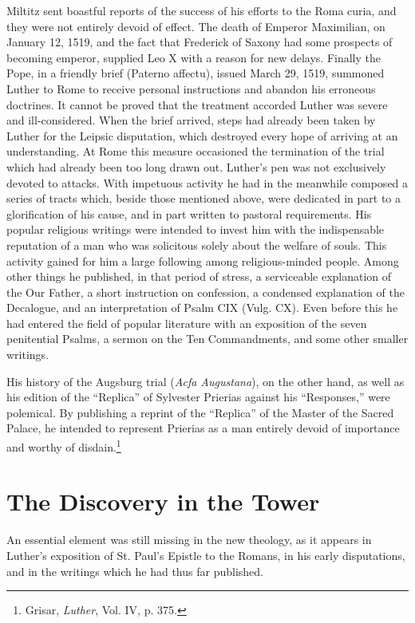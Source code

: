 Miltitz sent boastful reports of the success of his efforts to the
Roma curia, and they were not entirely devoid of effect. The death
of Emperor Maximilian, on January 12, 1519, and the fact that
Frederick of Saxony had some prospects of becoming emperor, supplied Leo
X with a reason for new delays. Finally the Pope, in a friendly
brief (Paterno affectu), issued March 29, 1519, summoned Luther
to Rome to receive personal instructions and abandon his erroneous
doctrines. It cannot be proved that the treatment accorded Luther
was severe and ill-considered. When the brief arrived, steps had already
been taken by Luther for the Leipsic disputation, which destroyed every
hope of arriving at an understanding. At Rome this
measure occasioned the termination of the trial which had already
been too long drawn out.
Luther’s pen was not exclusively devoted to attacks. With impetuous activity
he had in the meanwhile composed a series of tracts
which, beside those mentioned above, were dedicated in part to a
glorification of his cause, and in part written to pastoral requirements.
His popular religious writings were intended to invest him
with the indispensable reputation of a man who was solicitous solely
about the welfare of souls. This activity gained for him a large following
among religious-minded people. Among other things he published,
in that period of stress, a serviceable explanation of the Our Father, a
short instruction on confession, a condensed explanation of the
Decalogue, and an interpretation of Psalm CIX (Vulg. CX). Even
before this he had entered the field of popular literature with an
exposition of the seven penitential Psalms, a sermon on the Ten Commandments,
and some other smaller writings.

His history of the Augsburg trial (\textit{Acfa Augustana}), on the other
hand, as well as his edition of the “Replica” of Sylvester Prierias
against his “Responses,” were polemical. By publishing a reprint of
the “Replica” of the Master of the Sacred Palace, he intended to
represent Prierias as a man entirely devoid of importance and worthy
of disdain.\footnote{Grisar, \textit{Luther}, Vol. IV, p. 375.}

\section{The Discovery in the Tower}

An essential element was still missing in the new theology, as it
appears in Luther’s exposition of St. Paul’s Epistle to the Romans, in
his early disputations, and in the writings which he had thus far published.

